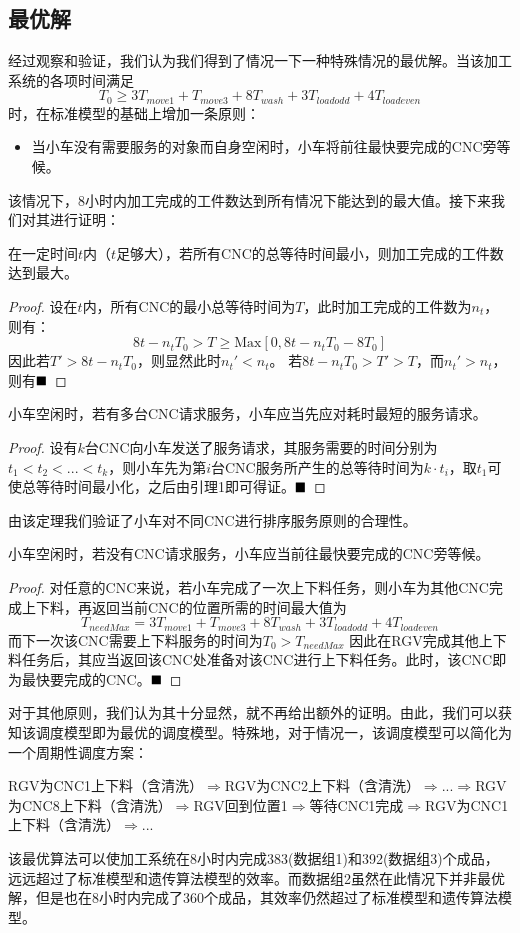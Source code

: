 \documentclass{cumcmthesis}
\begin{document}
	\subsection{最优解}
	经过观察和验证，我们认为我们得到了情况一下一种特殊情况的最优解。当该加工系统的各项时间满足
	\[T_0 \geq 3T_{move 1}+T_{move 3}+8T_{wash}+3T_{load odd}+4T_{load even}\]
	时，在标准模型的基础上增加一条原则：
	\begin{itemize}
		\item 当小车没有需要服务的对象而自身空闲时，小车将前往最快要完成的CNC旁等候。
	\end{itemize}
	该情况下，8小时内加工完成的工件数达到所有情况下能达到的最大值。接下来我们对其进行证明：
	\begin{lemma}
		在一定时间$t$内（$t$足够大），若所有CNC的总等待时间最小，则加工完成的工件数达到最大。
	\end{lemma}
	\begin{proof}
		设在$t$内，所有CNC的最小总等待时间为$T$，此时加工完成的工件数为$n_t$，则有：
		$$8t-n_tT_0>T\geq \textrm{Max}[0, 8t-n_tT_0-8T_0]$$
		因此若$T'>8t-n_tT_0$，则显然此时$n_t'<n_t$。\newline
		若$8t-n_tT_0>T'>T$，而$n_t'>n_t$，则有$\hfill\blacksquare$
	\end{proof}
	\begin{theorem}
		小车空闲时，若有多台CNC请求服务，小车应当先应对耗时最短的服务请求。
	\end{theorem}
	\begin{proof}
		设有$k$台CNC向小车发送了服务请求，其服务需要的时间分别为$t_1<t_2<...<t_k$，则小车先为第$i$台CNC服务所产生的总等待时间为$k\cdot t_i$，取$t_1$可使总等待时间最小化，之后由引理1即可得证。$\hfill\blacksquare$
	\end{proof}
	由该定理我们验证了小车对不同CNC进行排序服务原则的合理性。
	\begin{theorem}
		小车空闲时，若没有CNC请求服务，小车应当前往最快要完成的CNC旁等候。
	\end{theorem}
	\begin{proof}
		对任意的CNC来说，若小车完成了一次上下料任务，则小车为其他CNC完成上下料，再返回当前CNC的位置所需的时间最大值为
		\[T_{needMax}=3T_{move 1}+T_{move 3}+8T_{wash}+3T_{load odd}+4T_{load even}\]
		而下一次该CNC需要上下料服务的时间为$T_0>T_{needMax}$
		因此在RGV完成其他上下料任务后，其应当返回该CNC处准备对该CNC进行上下料任务。此时，该CNC即为最快要完成的CNC。$\hfill\blacksquare$
	\end{proof}
	对于其他原则，我们认为其十分显然，就不再给出额外的证明。由此，我们可以获知该调度模型即为最优的调度模型。特殊地，对于情况一，该调度模型可以简化为一个周期性调度方案：
	\begin{center}
	\fangsong
	RGV为CNC1上下料（含清洗）$\Rightarrow$RGV为CNC2上下料（含清洗）$\Rightarrow$...\newline$\Rightarrow$RGV为CNC8上下料（含清洗）$\Rightarrow$RGV回到位置1\newline$\Rightarrow$等待CNC1完成$\Rightarrow$RGV为CNC1上下料（含清洗）$\Rightarrow$...
	\end{center}
	该最优算法可以使加工系统在8小时内完成383(数据组1)和392(数据组3)个成品，远远超过了标准模型和遗传算法模型的效率。而数据组2虽然在此情况下并非最优解，但是也在8小时内完成了360个成品，其效率仍然超过了标准模型和遗传算法模型。
\end{document}
